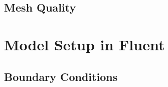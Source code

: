 \documentclass{article}
\begin{document}



\subsection{Mesh Quality}



\section{Model Setup in Fluent}


\subsection{Boundary Conditions}


\end{document}

